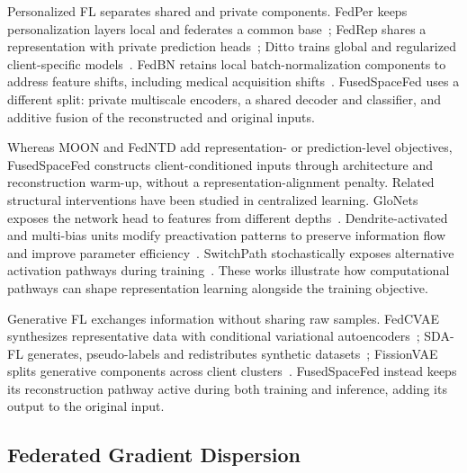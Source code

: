 \documentclass[twoside]{article}
\theoremstyle{thmstyleone}%
\theoremstyle{thmstyletwo}%
\theoremstyle{thmstylethree}%
\begin{document}
Personalized FL separates shared and private components. FedPer keeps
personalization layers local and federates a common
base~\cite{arivazhagan2019fedper}; FedRep shares a representation with private
prediction heads~\cite{collins2021fedrep}; Ditto trains global and regularized
client-specific models~\cite{li2021ditto}. FedBN retains local batch-normalization
components to address feature shifts, including medical acquisition
shifts~\cite{li2021fedbn}. FusedSpaceFed uses a different split: private
multiscale encoders, a shared decoder and classifier, and additive fusion of
the reconstructed and original inputs.

Whereas MOON and FedNTD add representation- or prediction-level objectives,
FusedSpaceFed constructs client-conditioned inputs through architecture and
reconstruction warm-up, without a representation-alignment penalty.
Related structural interventions have been studied in centralized learning.
GloNets exposes the network head to features from different
depths~\cite{dicecco2024glonets}. Dendrite-activated and multi-bias units modify
preactivation patterns to preserve information flow and improve parameter
efficiency~\cite{metta2024increasingbiases,metta2025dac,metta2025increasingbiases}.
SwitchPath stochastically exposes alternative activation pathways during
training~\cite{dicecco2025switchpath,dicecco2025switchpathjournal}. These works
illustrate how computational pathways can shape representation learning
alongside the training objective.

Generative FL exchanges information without sharing raw samples. FedCVAE
synthesizes representative data with conditional variational
autoencoders~\cite{tu2021fedcvae}; SDA-FL generates, pseudo-labels and
redistributes synthetic datasets~\cite{qu2022sdafl}; FissionVAE splits
generative components across client clusters~\cite{zhang2024fissionvae}.
FusedSpaceFed instead keeps its reconstruction pathway active during both
training and inference, adding its output to the original input.

\subsection{Federated Gradient Dispersion}
\end{document}
